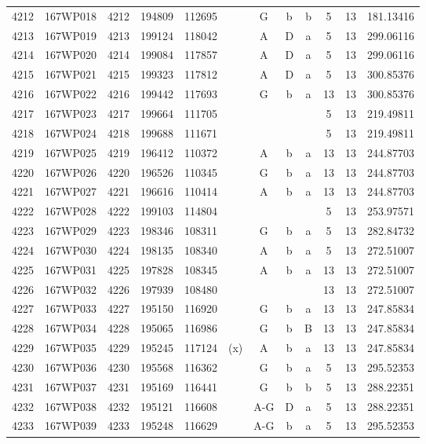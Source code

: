 \begin{tabular}{|*{12}{c|}}
4212 & 167WP018 & 4212 & 194809 & 112695 &  & G & b & b & 5 & 13 & 181.13416 \\ 
4213 & 167WP019 & 4213 & 199124 & 118042 &  & A & D & a & 5 & 13 & 299.06116 \\ 
4214 & 167WP020 & 4214 & 199084 & 117857 &  & A & D & a & 5 & 13 & 299.06116 \\ 
4215 & 167WP021 & 4215 & 199323 & 117812 &  & A & D & a & 5 & 13 & 300.85376 \\ 
4216 & 167WP022 & 4216 & 199442 & 117693 &  & G & b & a & 13 & 13 & 300.85376 \\ 
4217 & 167WP023 & 4217 & 199664 & 111705 &  &  &  &  & 5 & 13 & 219.49811 \\ 
4218 & 167WP024 & 4218 & 199688 & 111671 &  &  &  &  & 5 & 13 & 219.49811 \\ 
4219 & 167WP025 & 4219 & 196412 & 110372 &  & A & b & a & 13 & 13 & 244.87703 \\ 
4220 & 167WP026 & 4220 & 196526 & 110345 &  & G & b & a & 13 & 13 & 244.87703 \\ 
4221 & 167WP027 & 4221 & 196616 & 110414 &  & A & b & a & 13 & 13 & 244.87703 \\ 
4222 & 167WP028 & 4222 & 199103 & 114804 &  &  &  &  & 5 & 13 & 253.97571 \\ 
4223 & 167WP029 & 4223 & 198346 & 108311 &  & G & b & a & 5 & 13 & 282.84732 \\ 
4224 & 167WP030 & 4224 & 198135 & 108340 &  & A & b & a & 5 & 13 & 272.51007 \\ 
4225 & 167WP031 & 4225 & 197828 & 108345 &  & A & b & a & 13 & 13 & 272.51007 \\ 
4226 & 167WP032 & 4226 & 197939 & 108480 &  &  &  &  & 13 & 13 & 272.51007 \\ 
4227 & 167WP033 & 4227 & 195150 & 116920 &  & G & b & a & 13 & 13 & 247.85834 \\ 
4228 & 167WP034 & 4228 & 195065 & 116986 &  & G & b & B & 13 & 13 & 247.85834 \\ 
4229 & 167WP035 & 4229 & 195245 & 117124 & (x) & A & b & a & 13 & 13 & 247.85834 \\ 
4230 & 167WP036 & 4230 & 195568 & 116362 &  & G & b & a & 5 & 13 & 295.52353 \\ 
4231 & 167WP037 & 4231 & 195169 & 116441 &  & G & b & b & 5 & 13 & 288.22351 \\ 
4232 & 167WP038 & 4232 & 195121 & 116608 &  & A-G & D & a & 5 & 13 & 288.22351 \\ 
4233 & 167WP039 & 4233 & 195248 & 116629 &  & A-G & b & a & 5 & 13 & 295.52353 \\ 

\end{tabular}
